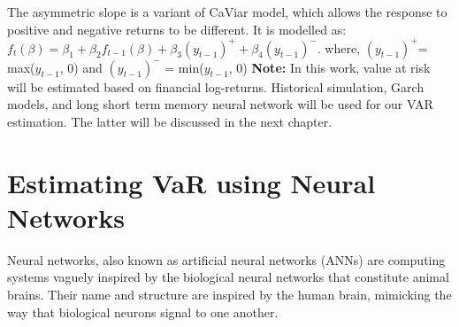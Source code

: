 \documentclass[a4paper,11pt,oneside]{book}
\begin{document}
\newline\newline
The asymmetric slope is a variant of CaViar model, which allows the response to positive and negative returns to be different. It is modelled as:\newline\newline
$f_{t}(\beta)= \beta_{1} +\beta_{2}f_{t-1}(\beta)+\beta_{3}(y_{t-1})^{+} + \beta_{4}(y_{t-1})^{-}$. where, $(y_{t-1})^{+}$= max($y_{t-1}$, 0) and $(y_{t-1})^{-}$ = min($y_{t-1}$, 0)
\newline\newline
\textbf{Note:} In this work, value at risk will be estimated based on financial log-returns. Historical simulation, Garch models, and long short term memory neural network will be used for our VAR estimation. The latter will be discussed in the next chapter.

\chapter{Estimating VaR using Neural Networks
}
Neural networks, also known as artificial neural networks (ANNs) are computing systems vaguely inspired by the biological neural networks that constitute animal brains. Their name and structure are inspired by the human brain, mimicking the way that biological neurons signal to one another.\newline\newline
\end{document}
